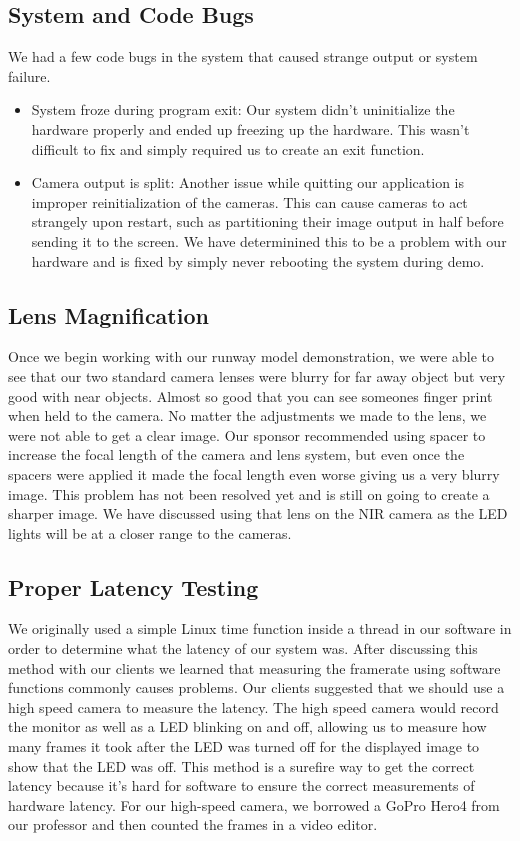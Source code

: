 \documentclass[letterpaper,10pt,titlepage]{IEEEtran}
\begin{document}
     \subsection{System and Code Bugs}
	We had a few code bugs in the system that caused strange output or system failure.\\
	\begin{itemize}
		\item System froze during program exit: Our system didn't uninitialize the hardware properly and ended up freezing up the hardware. This wasn't difficult to fix and simply required us to create an exit function.
		\item Camera output is split: Another issue while quitting our application is improper reinitialization of the cameras. This can cause cameras to act strangely upon restart, such as partitioning their image output in half before sending it to the screen. We have determinined this to be a problem with our hardware and is fixed by simply never rebooting the system during demo.
	\end{itemize}
   
   \subsection{Lens Magnification}
   Once we begin working with our runway model demonstration, we were able to see that our two standard camera lenses were blurry for far away object but very good with near objects. Almost so good that you can see someones finger print when held to the camera. No matter the adjustments we made to the lens, we were not able to get a clear image. Our sponsor recommended using spacer to increase the focal length of the camera and lens system, but even once the spacers were applied it made the focal length even worse giving us a very blurry image. This problem has not been resolved yet and is still on going to create a sharper image. We have discussed using that lens on the NIR camera as the LED lights will be at a closer range to the cameras. 

   \subsection{Proper Latency Testing}
   We originally used a simple Linux time function inside a thread in our software in order to determine what the latency of our system was. After discussing this method with our clients we learned that measuring the framerate using software functions commonly causes problems. Our clients suggested that we should use a high speed camera to measure the latency. The high speed camera would record the monitor as well as a LED blinking on and off, allowing us to measure how many frames it took after the LED was turned off for the displayed image to show that the LED was off. This method is a surefire way to get the correct latency because it's hard for software to ensure the correct measurements of hardware latency. For our high-speed camera, we borrowed a GoPro Hero4 from our professor and then counted the frames in a video editor.
   
\end{document}
